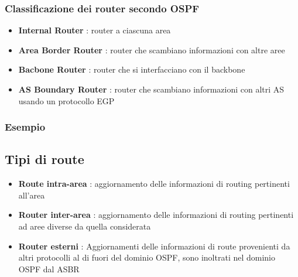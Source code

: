 \documentclass{report}
\begin{document}
                \subsubsection{Classificazione dei router secondo OSPF}
                    \begin{itemize}
                        \item \textbf{Internal Router} : router a ciascuna area
                        \item \textbf{Area Border Router} : router che scambiano informazioni con altre aree
                        \item \textbf{Bacbone Router} : router che si interfacciano con il backbone
                        \item \textbf{AS Boundary Router} : router che scambiano informazioni con altri AS usando un protocollo EGP
                    \end{itemize}
                \subsubsection{Esempio}
            \subsection{Tipi di route}
                \begin{itemize}
                    \item \textbf{Route intra-area} : aggiornamento delle informazioni di routing pertinenti all'area
                    \item \textbf{Router inter-area} : aggiornamento delle informazioni di routing pertinenti ad aree diverse da quella considerata
                    \item \textbf{Router esterni} : Aggiornamenti delle informazioni di route provenienti da altri protocolli al di fuori del dominio OSPF, sono inoltrati nel dominio OSPF dal ASBR  
                \end{itemize}
\end{document}
